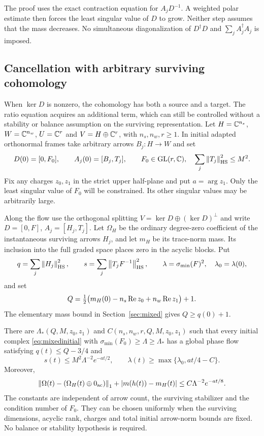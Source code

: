 The proof uses the exact contraction equation for $A_jD^{-1}$.
A weighted polar estimate then forces the least singular value of $D$
to grow. Neither step assumes that the mass decreases.
No simultaneous diagonalization of $D^\dagger D$ and
$\sum_j A_j^\dagger A_j$ is imposed.

\subsection{Cancellation with arbitrary surviving cohomology}
When $\ker D$ is nonzero, the cohomology has both a source and a target.
The ratio equation acquires an additional term, which can still be
controlled without a stability or balance assumption on the surviving
representation. Let $H=\mathbb C^{n_s}$, $W=\mathbb C^{n_w}$, $U=\mathbb C^r$ and
$V=H\oplus\mathbb C^r$, with $n_s,n_w,r\geq1$. In initial adapted
orthonormal frames take arbitrary arrows $B_j:H\to W$ and set
\begin{equation}\label{eq:mixedinitial}
 D(0)=[0,F_0],\qquad A_j(0)=[B_j,T_j],\qquad
 F_0\in\operatorname{GL}(r,\mathbb C),\quad \sum_j\left\lVert T_j\right\rVert_{\mathrm{HS}}^2\leq M^2.
\end{equation}
Fix any charges $z_0,z_1$ in the strict upper half-plane and put
$a=\arg z_1$. Only the least singular value of $F_0$ will be constrained.
Its other singular values may be arbitrarily large.

Along the flow use the orthogonal splitting
$V=\ker D\oplus(\ker D)^\perp$ and write $D=[0,F]$, $A_j=[H_j,T_j]$.
Let $\Omega_H$ be the ordinary degree-zero coefficient of the
instantaneous surviving arrows $H_j$, and let $m_H$ be its trace-norm
mass. Its inclusion into the full graded space places zero in the
acyclic blocks. Put
\[
 q=\sum_j\left\lVert H_j\right\rVert_{\mathrm{HS}}^2,\qquad
 s=\sum_j\left\lVert T_jF^{-1}\right\rVert_{\mathrm{HS}}^2,\qquad
 \lambda=\sigma_{\min}(F)^2,\quad\lambda_0=\lambda(0),
\]
and set
\[
 Q=\tfrac12\bigl(m_H(0)-n_s\operatorname{Re} z_0+n_w\operatorname{Re} z_1\bigr)+1.
\]
The elementary mass bound in Section~\ref{sec:mixed} gives
$Q\geq q(0)+1$.

\begin{theorem}\label{thm:intromixed}
There are $\Lambda_*(Q,M,z_0,z_1)$ and
$C(n_s,n_w,r,Q,M,z_0,z_1)$ such that every initial complex
\eqref{eq:mixedinitial} with
$\sigma_{\min}(F_0)\geq\Lambda\geq\Lambda_*$ has a global phase flow
satisfying $q(t)\leq Q-3/4$ and
\begin{equation}\label{eq:intromixedratios}
 s(t)\leq M^2\Lambda^{-2}e^{-at/2},\qquad
 \lambda(t)\geq\max\{\lambda_0,at/4-C\}.
\end{equation}
Moreover,
\begin{equation}\label{eq:intromixed}
 \left\lVert\Omega(t)-(\Omega_H(t)\oplus0_{\mathrm{ac}})\right\rVert_1+
 |m(h(t))-m_H(t)|\leq C\Lambda^{-2}e^{-at/8}.
\end{equation}
The constants are independent of arrow count, the surviving stabilizer
and the condition number of $F_0$. They can be chosen uniformly when
the surviving dimensions, acyclic rank, charges and total initial
arrow-norm bounds are fixed. No balance or stability hypothesis is required.
\end{theorem}

